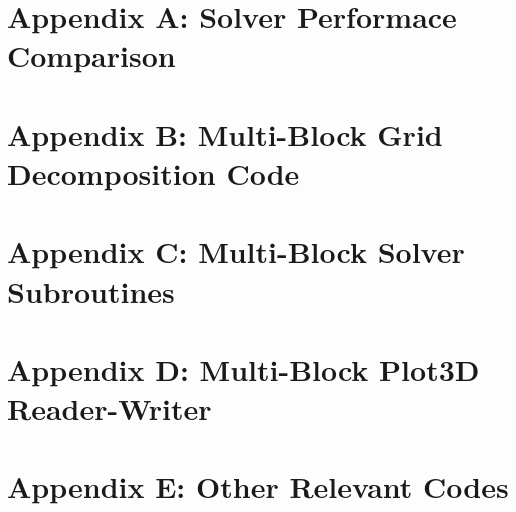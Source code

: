 \documentclass[twocolumn,10pt]{asme2ej}
\begin{document}
\onecolumn
\appendix       %

\section*{Appendix A: Solver Performace Comparison} \label{times}
% 
% 

\section*{Appendix B: Multi-Block Grid Decomposition Code}


\section*{Appendix C: Multi-Block Solver Subroutines}


\clearpage

\section*{Appendix D: Multi-Block Plot3D Reader-Writer}


\section*{Appendix E: Other Relevant Codes}






%
\end{document}
